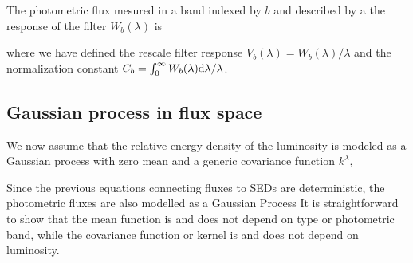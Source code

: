 \documentclass[aps,prd,showpacs,superscriptaddress,groupedaddress]{revtex4}  %
\begin{document}
The photometric flux mesured in a band indexed by $b$ and described by a the response of the filter $W_b(\lambda)$ is

where we have defined the rescale filter response $V_b(\lambda) = W_b(\lambda)/\lambda$ and the normalization constant $C_b = \int_0^\infty W_b(\lambda) \mathrm{d}\lambda / \lambda$.

\subsection{Gaussian process in flux space}

We now assume that the relative energy density of the luminosity is modeled as a Gaussian process with zero mean and a generic covariance function $k^\lambda$,
	
Since the previous equations connecting fluxes to SEDs are deterministic, the photometric fluxes are also modelled as a Gaussian Process 
It is straightforward to show that the mean function is
and does not depend on type or photometric band, while the covariance function or kernel is
and does not depend on luminosity.
\end{document}
